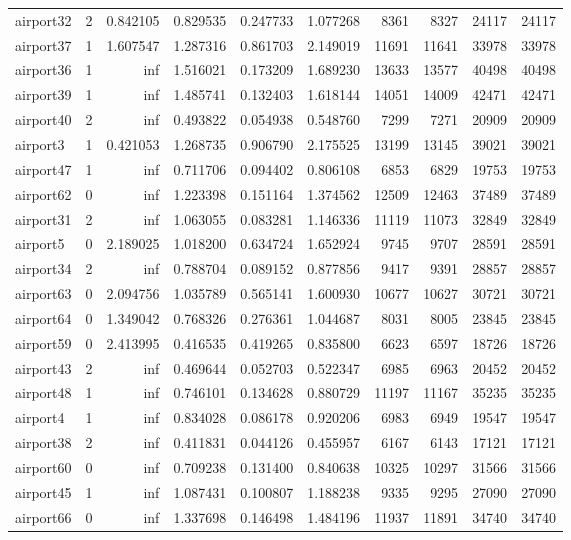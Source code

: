 \begin{longtable}{|l|r|r|r|r|r|r|r|r|r|}
airport32 & 2 & 0.842105 & 0.829535 & 0.247733 & 1.077268 & 8361 & 8327 & 24117 & 24117 \\
airport37 & 1 & 1.607547 & 1.287316 & 0.861703 & 2.149019 & 11691 & 11641 & 33978 & 33978 \\
airport36 & 1 & inf & 1.516021 & 0.173209 & 1.689230 & 13633 & 13577 & 40498 & 40498 \\
airport39 & 1 & inf & 1.485741 & 0.132403 & 1.618144 & 14051 & 14009 & 42471 & 42471 \\
airport40 & 2 & inf & 0.493822 & 0.054938 & 0.548760 & 7299 & 7271 & 20909 & 20909 \\
airport3 & 1 & 0.421053 & 1.268735 & 0.906790 & 2.175525 & 13199 & 13145 & 39021 & 39021 \\
airport47 & 1 & inf & 0.711706 & 0.094402 & 0.806108 & 6853 & 6829 & 19753 & 19753 \\
airport62 & 0 & inf & 1.223398 & 0.151164 & 1.374562 & 12509 & 12463 & 37489 & 37489 \\
airport31 & 2 & inf & 1.063055 & 0.083281 & 1.146336 & 11119 & 11073 & 32849 & 32849 \\
airport5 & 0 & 2.189025 & 1.018200 & 0.634724 & 1.652924 & 9745 & 9707 & 28591 & 28591 \\
airport34 & 2 & inf & 0.788704 & 0.089152 & 0.877856 & 9417 & 9391 & 28857 & 28857 \\
airport63 & 0 & 2.094756 & 1.035789 & 0.565141 & 1.600930 & 10677 & 10627 & 30721 & 30721 \\
airport64 & 0 & 1.349042 & 0.768326 & 0.276361 & 1.044687 & 8031 & 8005 & 23845 & 23845 \\
airport59 & 0 & 2.413995 & 0.416535 & 0.419265 & 0.835800 & 6623 & 6597 & 18726 & 18726 \\
airport43 & 2 & inf & 0.469644 & 0.052703 & 0.522347 & 6985 & 6963 & 20452 & 20452 \\
airport48 & 1 & inf & 0.746101 & 0.134628 & 0.880729 & 11197 & 11167 & 35235 & 35235 \\
airport4 & 1 & inf & 0.834028 & 0.086178 & 0.920206 & 6983 & 6949 & 19547 & 19547 \\
airport38 & 2 & inf & 0.411831 & 0.044126 & 0.455957 & 6167 & 6143 & 17121 & 17121 \\
airport60 & 0 & inf & 0.709238 & 0.131400 & 0.840638 & 10325 & 10297 & 31566 & 31566 \\
airport45 & 1 & inf & 1.087431 & 0.100807 & 1.188238 & 9335 & 9295 & 27090 & 27090 \\
airport66 & 0 & inf & 1.337698 & 0.146498 & 1.484196 & 11937 & 11891 & 34740 & 34740 \\

\end{longtable}

